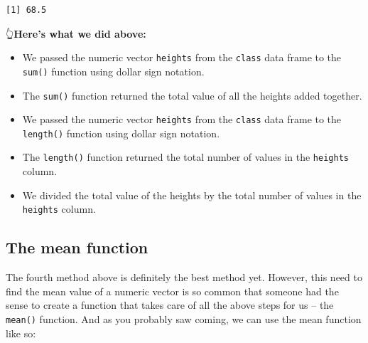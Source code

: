 \documentclass[
  letterpaper,
  DIV=11,
  numbers=noendperiod]{scrreprt}
\newenvironment{Shaded}{\begin{snugshade}}{\end{snugshade}}
\newcommand{\CommentTok}[1]{\textcolor[rgb]{0.37,0.37,0.37}{#1}}
\newcommand{\FunctionTok}[1]{\textcolor[rgb]{0.28,0.35,0.67}{#1}}
\newcommand{\NormalTok}[1]{\textcolor[rgb]{0.00,0.23,0.31}{#1}}
\newcommand{\SpecialCharTok}[1]{\textcolor[rgb]{0.37,0.37,0.37}{#1}}
\begin{document}
\begin{verbatim}
[1] 68.5
\end{verbatim}

👆\textbf{Here's what we did above:}

\begin{itemize}
\item
  We passed the numeric vector \texttt{heights} from the \texttt{class}
  data frame to the \texttt{sum()} function using dollar sign notation.
\item
  The \texttt{sum()} function returned the total value of all the
  heights added together.
\item
  We passed the numeric vector \texttt{heights} from the \texttt{class}
  data frame to the \texttt{length()} function using dollar sign
  notation.
\item
  The \texttt{length()} function returned the total number of values in
  the \texttt{heights} column.
\item
  We divided the total value of the heights by the total number of
  values in the \texttt{heights} column.
\end{itemize}

\subsection{The mean function}\label{the-mean-function}

The fourth method above is definitely the best method yet. However, this
need to find the mean value of a numeric vector is so common that
someone had the sense to create a function that takes care of all the
above steps for us -- the \texttt{mean()} function. And as you probably
saw coming, we can use the mean function like so:

\begin{Shaded}
\end{Shaded}
\end{document}
